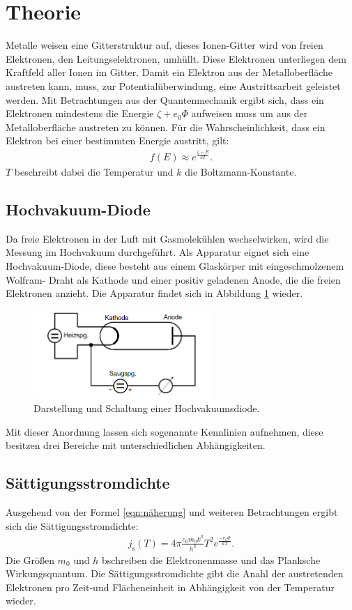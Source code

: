 \section{Theorie}
\label{sec:Theorie}
Metalle weisen eine Gitterstruktur auf, dieses Ionen-Gitter wird von freien Elektronen, den Leitungselektronen,
umhüllt. Diese Elektronen unterliegen dem Kraftfeld aller Ionen im Gitter.
Damit ein Elektron aus der Metalloberfläche austreten kann, muss, zur Potentialüberwindung, eine
Austrittsarbeit geleistet werden. Mit Betrachtungen aus der Quantenmechanik ergibt sich, dass
ein Elektronen mindestens die Energie $\zeta+e_\mathrm{0}\Phi$ aufweisen muss um aus der Metalloberfläche
austreten zu können. Für die Wahrscheinlichkeit, dass ein Elektron bei einer bestimmten Energie austritt, gilt:
\begin{align}
f(E)\approx e^{\frac{\zeta-E}{kT}}\label{eqn:naeherung}.
\end{align}
$T$ beschreibt dabei die Temperatur und $k$ die Boltzmann-Konstante.

\subsection{Hochvakuum-Diode}
Da freie Elektronen in der Luft mit Gasmolekühlen wechselwirken, wird die Messung im Hochvakuum durchgeführt.
Als Apparatur eignet sich eine Hochvakuum-Diode, diese besteht aus einem Glaskörper mit eingeschmolzenem Wolfram-
Draht als Kathode und einer positiv geladenen Anode, die die freien Elektronen anzieht.
Die Apparatur findet sich in Abbildung \ref{fig:aufbau} wieder.
\begin{figure}
 \centering
 \includegraphics[width=0.6\textwidth]{aufbau.png}
 \caption{Darstellung und Schaltung einer Hochvakuumsdiode.\cite{sample}}
 \label{fig:aufbau}
 \end{figure}
 Mit dieser Anordnung lassen sich sogenannte Kennlinien aufnehmen, diese besitzen drei Bereiche mit unterschiedlichen Abhängigkeiten.

\subsection{Sättigungsstromdichte}
Ausgehend von der Formel \eqref{eqn:näherung} und weiteren Betrachtungen ergibt sich
die Sättigungsstromdichte:
\begin{align}
j_\mathrm{s}(T)=4\pi\frac{e_\mathrm{0} m_\mathrm{0} k^2}{h^3} T^2 e^{\frac{-e_\mathrm{0}\Phi}{kT}} \label{eqn:st}.
\end{align}
Die Größen $m_\mathrm{0}$ und $h$ bschreiben die Elektronenmasse und das Planksche Wirkungsquantum.
Die Sättigungsstromdichte gibt die Anahl der austretenden Elektronen pro Zeit-und Flächeneinheit
in Abhängigkeit von der Temperatur wieder.

